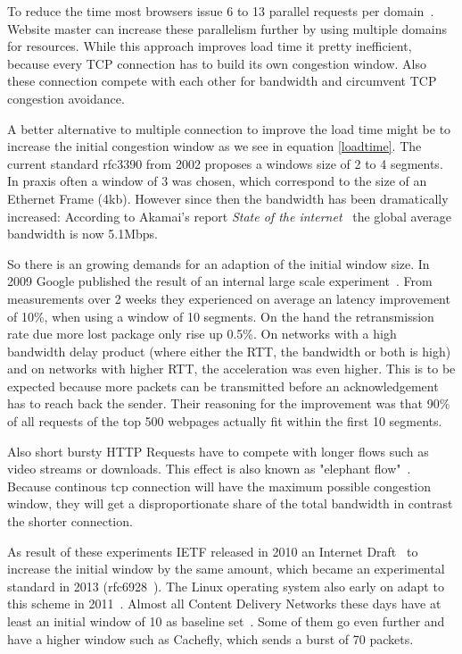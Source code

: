 To reduce the time most browsers issue 6 to 13 parallel requests per
domain~\cite{browserscope}. Website master can increase these parallelism
further by using multiple domains for resources. While this approach improves
load time it pretty inefficient, because every TCP connection has to build its
own congestion window. Also these connection compete with each other for
bandwidth and circumvent TCP congestion avoidance.

A better alternative to multiple connection to improve the load time might be to
increase the initial congestion window as we see in equation \ref{loadtime}. The
current standard rfc3390 from 2002 proposes a windows size of 2 to 4 segments.
In praxis often a window of 3 was chosen, which correspond to the size of an
Ethernet Frame (4kb). However since then the bandwidth has been dramatically
increased: According to Akamai's report \emph{State of the
internet}~\cite{q3-2015-soti-connectivity-final} the global average bandwidth is
now 5.1Mbps.

So there is an growing demands for an adaption of the initial window size. In
2009 Google published the result of an internal large scale
experiment~\cite{36640}. From measurements over 2 weeks they experienced on
average an latency improvement of 10\%, when using a window of 10 segments. On
the hand the retransmission rate due more lost package only rise up 0.5\%. On
networks with a high bandwidth delay product (where either the RTT, the
bandwidth or both is high) and on networks with higher RTT, the acceleration was
even higher. This is to be expected because more packets can be transmitted
before an acknowledgement has to reach back the sender. Their reasoning for the
improvement was that 90\% of all requests of the top 500 webpages actually fit
within the first 10 segments.

Also short bursty HTTP Requests have to compete with longer flows such as
video streams or downloads. This effect is also known as "elephant
flow"~\cite{992898}. Because continous tcp connection will have the maximum
possible congestion window, they will get a disproportionate share of the total
bandwidth in contrast the shorter connection.

As result of these experiments IETF released in 2010 an Internet
Draft~\cite{draft-ietf-tcpm-initcwnd-00} to increase the initial window by the
same amount, which became an experimental standard in 2013
(rfc6928~\cite{rfc6928}). The Linux operating system also early on adapt to this
scheme in 2011~\cite{linux}. Almost all Content Delivery Networks these days
have at least an initial window of 10 as baseline set~\cite{cdnplanet}. Some of
them go even further and have a higher window such as Cachefly, which sends a
burst of 70 packets.
